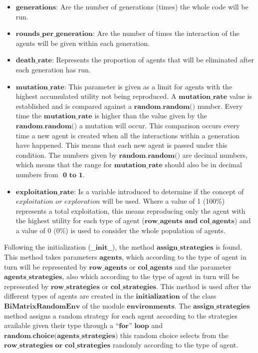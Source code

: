 \documentclass{article}
\begin{document}
\begin{itemize}
	\item $\textbf{generations:}$ Are the number of generations (times) the whole code will be run.
	\item $\textbf{rounds\_per\_generation:}$ Are the number of times the interaction of the agents will be given within each generation. 
	\item $\textbf{death\_rate:}$ Represents the proportion of agents that will be eliminated after each generation has run.
	\item $\textbf{mutation\_rate:}$ This parameter is given as a limit for agents with the highest accumulated utility not being reproduced. A $\textbf{mutation\_rate}$ value is established and is compared against a $\textbf{random.random()}$ number. Every time the $\textbf{mutation\_rate}$ is higher than the value given by the $\textbf{random.random()}$ a mutation will occur. This comparison occurs every time a new agent is created when all the interactions within a generation have happened. This means that each new agent is passed under this condition. The numbers given by $\textbf{random.random()}$ are decimal numbers, which means that the range for $\textbf{mutation\_rate}$ should also be in decimal numbers from $\textbf{ 0 to 1}$.
	\item $\textbf{exploitation\_rate:}$ Is a variable introduced to determine if the concept of $\textit{exploitation or exploration}$ will be used. Where a value of 1 (100$\%$) represents a total exploitation, this means reproducing only the agent with the highest utility for each type of agent ($\textbf{row\_agents and col\_agents}$) and a value of 0 (0$\%$) is used to consider the whole population of agents.
\end{itemize}

Following the initialization ($\textbf{\_\_init\_\_}$), the method $\textbf{assign\_strategies}$ is found. This method takes parameters $\textbf{agents}$, which according to the type of agent in turn will be represented by $\textbf{row\_agents}$ or $\textbf{col\_agents}$  and the parameter $\textbf{agents\_strategies}$, also which according to the type of agent in turn will be represented by $\textbf{row\_strategies}$ or $\textbf{col\_strategies}$. This method is used after the different types of agents are created in the $\textbf{initialization}$ of the class $\textbf{BiMatrixRandomEnv}$ of the module $\textbf{environments}$. The $\textbf{assign\_strategies}$ method assigns a random strategy for each agent according to the strategies available given their type through a $\textbf{``for'' loop}$ and $\textbf{random.choice(agents\_strategies)}$ this random choice selects from the $\textbf{row\_strategies or col\_strategies}$ randomly according to the type of agent.
\end{document}
